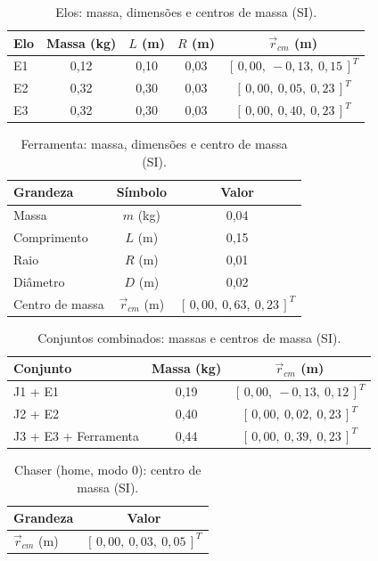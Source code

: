 \begin{table}[H]
\centering
\caption{Elos: massa, dimensões e centros de massa (SI).}
\label{tab:chaser_elos_SI}
\begin{tabular}{lcccc}
\hline
\textbf{Elo} & \textbf{Massa (kg)} & \textbf{$L$ (m)} & \textbf{$R$ (m)} & \textbf{$\vec{r}_{cm}$ (m)} \\
\hline
E1 & 0,12 & 0,10 & 0,03 & $[\,0,00,\ -0,13,\ 0,15\,]^T$ \\
E2 & 0,32 & 0,30 & 0,03 & $[\,0,00,\ 0,05,\ 0,23\,]^T$ \\
E3 & 0,32 & 0,30 & 0,03 & $[\,0,00,\ 0,40,\ 0,23\,]^T$ \\
\hline
\end{tabular}
\end{table}

\begin{table}[H]
\centering
\caption{Ferramenta: massa, dimensões e centro de massa (SI).}
\label{tab:chaser_ferramenta_SI}
\begin{tabular}{lcc}
\hline
\textbf{Grandeza} & \textbf{Símbolo} & \textbf{Valor} \\
\hline
Massa & $m$ (kg) & 0,04 \\
Comprimento & $L$ (m) & 0,15 \\
Raio & $R$ (m) & 0,01 \\
Diâmetro & $D$ (m) & 0,02 \\
Centro de massa & $\vec{r}_{cm}$ (m) & $[\,0,00,\ 0,63,\ 0,23\,]^T$ \\
\hline
\end{tabular}
\end{table}

\begin{table}[H]
\centering
\caption{Conjuntos combinados: massas e centros de massa (SI).}
\label{tab:chaser_combinados_SI}
\begin{tabular}{lcc}
\hline
\textbf{Conjunto} & \textbf{Massa (kg)} & \textbf{$\vec{r}_{cm}$ (m)} \\
\hline
J1 + E1 & 0,19 & $[\,0,00,\ -0,13,\ 0,12\,]^T$ \\
J2 + E2 & 0,40 & $[\,0,00,\ 0,02,\ 0,23\,]^T$ \\
J3 + E3 + Ferramenta & 0,44 & $[\,0,00,\ 0,39,\ 0,23\,]^T$ \\
\hline
\end{tabular}
\end{table}

\begin{table}[H]
\centering
\caption{Chaser (home, modo 0): centro de massa (SI).}
\label{tab:chaser_home_com_SI}
\begin{tabular}{lc}
\hline
\textbf{Grandeza} & \textbf{Valor} \\
\hline
$\vec{r}_{cm}$ (m) & $[\,0,00,\ 0,03,\ 0,05\,]^T$ \\
\hline
\end{tabular}
\end{table}

